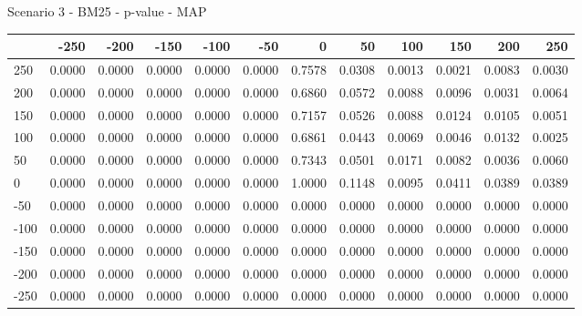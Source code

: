 Scenario 3 - BM25 - p-value - MAP
\begin{tabular}{lrrrrrrrrrrr}
\toprule
{} &   -250 &   -200 &   -150 &   -100 &   -50  &    0   &    50  &    100 &    150 &    200 &    250 \\
\midrule
 250 & 0.0000 & 0.0000 & 0.0000 & 0.0000 & 0.0000 & 0.7578 & 0.0308 & 0.0013 & 0.0021 & 0.0083 & 0.0030 \\
 200 & 0.0000 & 0.0000 & 0.0000 & 0.0000 & 0.0000 & 0.6860 & 0.0572 & 0.0088 & 0.0096 & 0.0031 & 0.0064 \\
 150 & 0.0000 & 0.0000 & 0.0000 & 0.0000 & 0.0000 & 0.7157 & 0.0526 & 0.0088 & 0.0124 & 0.0105 & 0.0051 \\
 100 & 0.0000 & 0.0000 & 0.0000 & 0.0000 & 0.0000 & 0.6861 & 0.0443 & 0.0069 & 0.0046 & 0.0132 & 0.0025 \\
 50  & 0.0000 & 0.0000 & 0.0000 & 0.0000 & 0.0000 & 0.7343 & 0.0501 & 0.0171 & 0.0082 & 0.0036 & 0.0060 \\
 0   & 0.0000 & 0.0000 & 0.0000 & 0.0000 & 0.0000 & 1.0000 & 0.1148 & 0.0095 & 0.0411 & 0.0389 & 0.0389 \\
-50  & 0.0000 & 0.0000 & 0.0000 & 0.0000 & 0.0000 & 0.0000 & 0.0000 & 0.0000 & 0.0000 & 0.0000 & 0.0000 \\
-100 & 0.0000 & 0.0000 & 0.0000 & 0.0000 & 0.0000 & 0.0000 & 0.0000 & 0.0000 & 0.0000 & 0.0000 & 0.0000 \\
-150 & 0.0000 & 0.0000 & 0.0000 & 0.0000 & 0.0000 & 0.0000 & 0.0000 & 0.0000 & 0.0000 & 0.0000 & 0.0000 \\
-200 & 0.0000 & 0.0000 & 0.0000 & 0.0000 & 0.0000 & 0.0000 & 0.0000 & 0.0000 & 0.0000 & 0.0000 & 0.0000 \\
-250 & 0.0000 & 0.0000 & 0.0000 & 0.0000 & 0.0000 & 0.0000 & 0.0000 & 0.0000 & 0.0000 & 0.0000 & 0.0000 \\
\bottomrule
\end{tabular}

